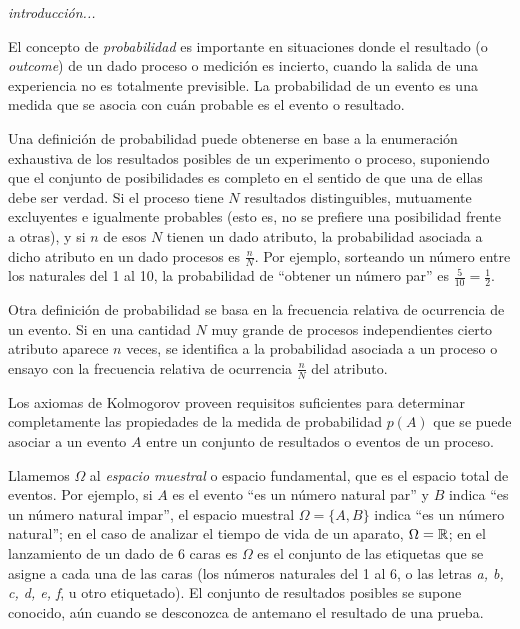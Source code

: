 \label{s:probabilidad}



\emph{introducci\'on...}

\vspace{1.5pt}

El  concepto  de  \emph{probabilidad}  es  importante en  situaciones  donde  el
resultado (o \emph{outcome}) de un dado proceso o medici\'on es incierto, cuando
la salida de una experiencia no  es totalmente previsible. La probabilidad de un
evento es una medida que se asocia con cu\'an probable es el evento o resultado.

Una  definici\'on de  probabilidad puede  obtenerse en  base a  la enumeraci\'on
exhaustiva de los resultados posibles de un experimento o proceso,
suponiendo que el conjunto de posibilidades es completo en el sentido de que una
de  ellas debe ser  verdad. Si  el proceso  tiene $N$  resultados distinguibles,
mutuamente  excluyentes e  igualmente probables  (esto  es, no  se prefiere  una
posibilidad frente a  otras), y si $n$  de esos $N$ tienen un  dado atributo, la
probabilidad asociada  a dicho atributo en  un dado procesos es  $\frac nN$. Por
ejemplo, sorteando un n\'umero entre los  naturales del 1 al 10, la probabilidad
de ``obtener un n\'umero par'' es $\frac5{10} = \frac12$.

Otra  definici\'on  de  probabilidad  se  basa  en  la  frecuencia  relativa  de
ocurrencia  de  un evento.   Si  en  una cantidad  $N$  muy  grande de  procesos
independientes  cierto   atributo  aparece  $n$   veces,  se  identifica   a  la
probabilidad  asociada a  un  proceso o  ensayo  con la  frecuencia relativa  de
ocurrencia $\frac nN$ del atributo.

Los  axiomas  de  Kolmogorov  proveen  requisitos  suficientes  para  determinar
completamente
%
las propiedades  de la medida de probabilidad  $p(A)$ que se puede  asociar a un
evento $A$ entre un conjunto de resultados o eventos de un proceso.

Llamemos $\Omega$  al \emph{espacio muestral}  o espacio fundamental, que  es el
espacio total  de eventos.  Por ejemplo, si  $A$ es  el evento ``es  un n\'umero
natural par'' y $B$ indica ``es un n\'umero natural impar'', el espacio muestral
$\Omega=\{A,B\}$ indica  ``es un n\'umero natural'';  en el caso  de analizar el
tiempo de vida de un aparato, $\Omega  = \mathbb{R}$; en el lanzamiento de un dado de
6 caras es $\Omega$ es el conjunto de  las etiquetas que se asigne a cada una de
las caras (los n\'umeros naturales del 1 al 6, o las letras \emph{a, b, c, d, e,
  f}, u otro etiquetado). El conjunto de resultados posibles se supone conocido,
a\'un cuando se desconozca de antemano el resultado de una prueba.

